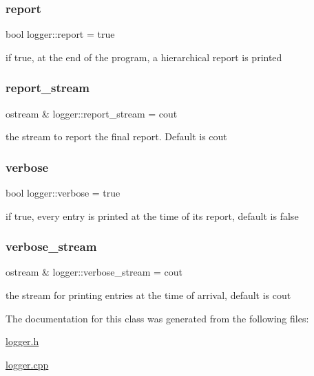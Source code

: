 \subsubsection{\texorpdfstring{report}{report}}
{\footnotesize\ttfamily bool logger\+::report = true\hspace{0.3cm}{\ttfamily [static]}}



if true, at the end of the program, a hierarchical report is printed 

\mbox{\label{classlogger_a8490b3400a43c9c6f3cc3cc122f10996}} 
\subsubsection{\texorpdfstring{report\+\_\+stream}{report\_stream}}
{\footnotesize\ttfamily ostream \& logger\+::report\+\_\+stream = cout\hspace{0.3cm}{\ttfamily [static]}}



the stream to report the final report. Default is cout 

\mbox{\label{classlogger_aab3c778c044ddf4b1b5fad8f4c230ff9}} 
\subsubsection{\texorpdfstring{verbose}{verbose}}
{\footnotesize\ttfamily bool logger\+::verbose = true\hspace{0.3cm}{\ttfamily [static]}}



if true, every entry is printed at the time of its report, default is false 

\mbox{\label{classlogger_aec58cd6310ffb9939f8509daf1fcfbf8}} 
\subsubsection{\texorpdfstring{verbose\+\_\+stream}{verbose\_stream}}
{\footnotesize\ttfamily ostream \& logger\+::verbose\+\_\+stream = cout\hspace{0.3cm}{\ttfamily [static]}}



the stream for printing entries at the time of arrival, default is cout 



The documentation for this class was generated from the following files\+:\begin{DoxyCompactItemize}
\item 
\hyperlink{logger_8h}{logger.\+h}\item 
\hyperlink{logger_8cpp}{logger.\+cpp}\end{DoxyCompactItemize}
